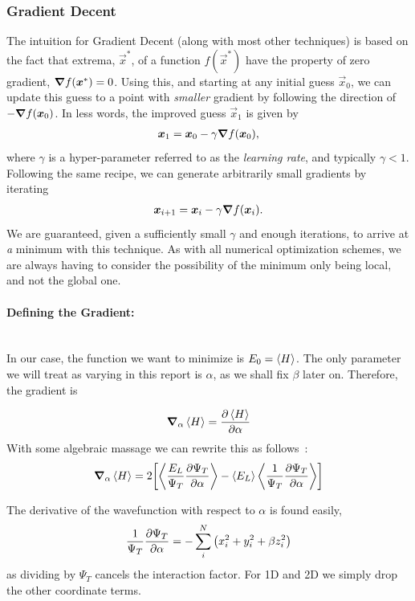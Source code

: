 \documentclass[a4paper, 11pt]{article}
\begin{document}
\begin{multicols}{2}
\subsubsection{Gradient Decent}

The intuition for Gradient Decent (along with most other techniques) is based on
the fact that extrema, $\vec x^*$, of a function $f(\vec x^*)$ have the property of zero gradient,
$\grad f(\bm x^*) = 0$. Using this, and starting at any initial guess $\vec
x_0$, we can update this guess to a point with \textit{smaller} gradient by
following the direction of $-\grad f(\bm x_0)$. In less words, the improved
guess $\vec x_1$ is given by
\begin{align}
    \bm x_1 = \bm x_0 - \gamma \grad f(\bm x_0),
\end{align}
where $\gamma$ is a hyper-parameter referred to as the \textit{learning rate},
and typically $\gamma < 1$.
Following the same recipe, we can generate arbitrarily small gradients by
iterating
\begin{align}
    \bm x_{i+1} = \bm x_i - \gamma \grad f(\bm x_i).
\end{align}
We are guaranteed, given a sufficiently small $\gamma$ and enough iterations, to
arrive at \textit{a} minimum with this technique. As with all numerical
optimization schemes, we are always having to consider the possibility of the
minimum only being local, and not the global one. 

\paragraph{Defining the Gradient:}$\,$\\

In our case, the function we want to minimize is $E_0=\expval{H}$. The only
parameter we will treat as varying in this report is $\alpha$, as we shall fix
$\beta$ later on. Therefore, the gradient is

\begin{align}
    \grad_\alpha \expval{H} = \pdv{\expval{H}}{\alpha}
\end{align}
With some algebraic massage we can rewrite this as
follows~\cite{mhj-compphys-II}:
\begin{align}
    \grad_\alpha \expval{H} =
    2\qty[\expval{\frac{E_L}{\Psi_T}\pdv{\Psi_T}{\alpha}} -
    \expval{E_L}\expval{\frac{1}{\Psi_T}\pdv{\Psi_T}{\alpha}}]\label{eq:gradient-nice}
\end{align}

The derivative of the wavefunction with respect to $\alpha$ is found easily,
\begin{align}
    \frac{1}{\Psi_T}\pdv{\Psi_T}{\alpha} = -\sum_{i}^N\qty(x_i^2 + y_i^2+\beta
    z_i^2)
\end{align}
as dividing by $\Psi_T$ cancels the interaction factor. For 1D and 2D we simply
drop the other coordinate terms.


\end{multicols}
\end{document}
